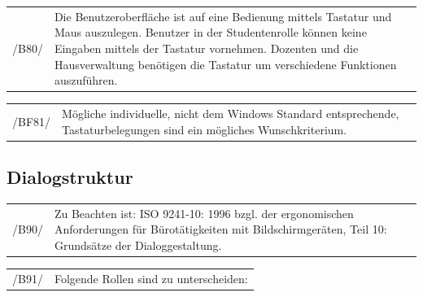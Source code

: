 \begin{tabular}{p{1.5cm}p{14.5cm}}
 /B80/	& Die Benutzeroberfläche ist auf eine Bedienung mittels Tastatur und Maus auszulegen. Benutzer in der Studentenrolle können keine Eingaben mittels der Tastatur vornehmen. Dozenten und die Hausverwaltung benötigen die Tastatur um verschiedene Funktionen auszuführen. \\[0.25cm]	 
\end{tabular}

\begin{tabular}{p{1.5cm}p{14.5cm}}
 /BF81/	& Mögliche individuelle, nicht dem Windows Standard entsprechende, Tastaturbelegungen sind ein mögliches  Wunschkriterium. \\[0.25cm]	 
\end{tabular}


\subsection{Dialogstruktur}

\begin{tabular}{p{1.5cm}p{14.5cm}}
 /B90/	& Zu Beachten ist: ISO 9241-10: 1996 bzgl. der ergonomischen Anforderungen für Bürotätigkeiten mit Bildschirmgeräten, Teil 10: Grundsätze der Dialoggestaltung. \\[0.25cm]	 
\end{tabular}

\begin{tabular}{p{1.5cm}p{14.5cm}}
 /B91/	& Folgende Rollen sind zu unterscheiden: \\[0.25cm]	 
\end{tabular}\\


